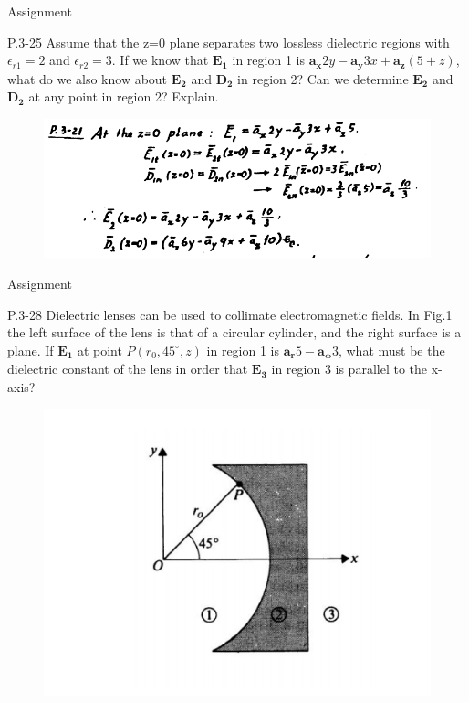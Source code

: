 \documentclass[xcolor={dvipsnames}]{beamer}
\begin{document}
\begin{frame}{Assignment}
\begin{block}{P.3-25}
Assume that the z=0 plane separates two lossless dielectric regions with $\epsilon_{r1}=2$ and $\epsilon_{r2}=3$. If we know that $\boldsymbol{E_1}$ in region 1 is $\boldsymbol{a_x}2y-\boldsymbol{a_y}3x+\boldsymbol{a_z}(5+z)$, what do we also know about $\boldsymbol{E_2}$ and $\boldsymbol{D_2}$ in region 2? Can we determine $\boldsymbol{E_2}$ and $\boldsymbol{D_2}$ at any point in region 2? Explain.\\
\end{block}
\pause
\begin{figure}[H]
	\centering
	\includegraphics[width=0.8\linewidth]{3_5.png}
\end{figure}
\end{frame}
\begin{frame}{Assignment}
\begin{block}{P.3-28}
Dielectric lenses can be used to collimate electromagnetic fields. In Fig.1 the left surface of the lens is that of a circular cylinder, and the right surface is a plane. If $\boldsymbol{E_1}$ at point $P(r_0,45^{\circ},z)$ in region 1 is $\boldsymbol{a_r}5-\boldsymbol{a_{\phi}}3$, what must be the dielectric constant of the lens in order that $\boldsymbol{E_3}$ in region 3 is parallel to the x-axis?\\
\end{block}
\begin{figure}[H]
	\centering
	\includegraphics[width=0.6\linewidth]{3_6.png}
\end{figure}
\end{frame}
\end{document}
